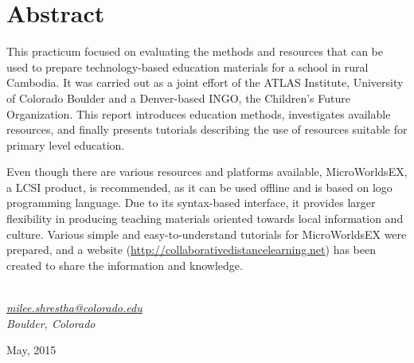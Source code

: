 \chapter*{Abstract}

This practicum focused on evaluating the methods and resources that can be used to prepare technology-based education materials for a school in rural Cambodia. It was carried out as a joint effort of the ATLAS Institute, University of Colorado Boulder and a Denver-based INGO, the Children's Future Organization. This report introduces education methods, investigates available resources, and finally presents tutorials describing the use of resources suitable for primary level education. 



Even though there are various resources and platforms available, MicroWorldsEX, a LCSI product, is recommended, as it can be used offline and is based on logo programming language. Due to its syntax-based interface, it provides larger flexibility in producing teaching materials oriented towards local information and culture. Various simple and easy-to-understand tutorials for MicroWorldsEX were prepared, and a website ({\small \url{http://collaborativedistancelearning.net}}) has been created to share the information and knowledge.


\begin{flushright}



{\makeatletter\itshape
    \@author \\
\href{mailto:milee.shrestha@colorado.edu}{milee.shrestha@colorado.edu}\\
    Boulder, Colorado
	
	May, 2015
\makeatother}
\end{flushright}

